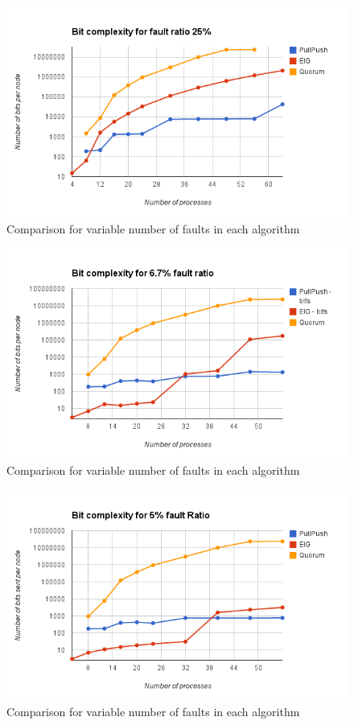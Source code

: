 \begin{figure}[h]
 \centering
\includegraphics[scale=0.4]{Fault25}
\caption{ Comparison for variable number of faults in each algorithm}
 \label{fig:fault25}
\end{figure}

\begin{figure}[h]
 \centering
\includegraphics[scale=0.4]{Fault667}
\caption{ Comparison for variable number of faults in each algorithm}
 \label{fig:fault667}
\end{figure}

\begin{figure}[h]
 \centering
\includegraphics[scale=0.4]{Fault5}
\caption{ Comparison for variable number of faults in each algorithm}
 \label{fig:fault5}
\end{figure}

